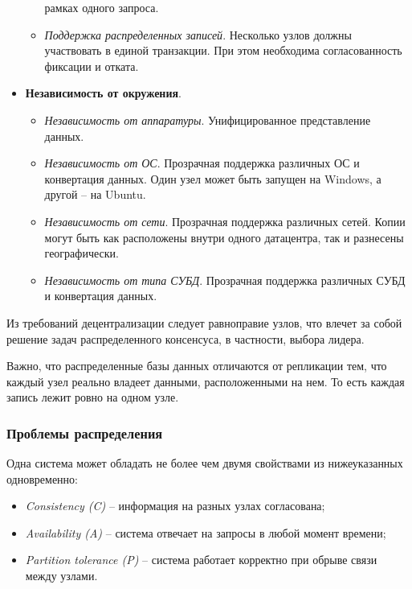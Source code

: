 \begin{itemize}
\begin{itemize}
		            рамках одного запроса.
		      \item \textit{Поддержка распределенных записей}. Несколько узлов должны участвовать в
		            единой транзакции. При этом необходима согласованность фиксации и отката.
	      \end{itemize}
	\item \textbf{Независимость от окружения}.
	      \begin{itemize}
		      \item \textit{Независимость от аппаратуры}. Унифицированное представление данных.
		      \item \textit{Независимость от ОС}. Прозрачная поддержка различных ОС и конвертация
		            данных. Один узел может быть запущен на Windows, а другой -- на Ubuntu.
		      \item \textit{Независимость от сети}. Прозрачная поддержка различных сетей. Копии могут
		            быть как расположены внутри одного датацентра, так и разнесены географически.
		      \item \textit{Независимость от типа СУБД}. Прозрачная поддержка различных СУБД и
		            конвертация данных.
	      \end{itemize}
\end{itemize}

Из требований децентрализации следует равноправие узлов, что влечет за собой решение задач
распределенного консенсуса, в частности, выбора лидера.

\begin{remark}
	Важно, что распределенные базы данных отличаются от репликации тем, что каждый узел реально владеет
	данными, расположенными на нем. То есть каждая запись лежит ровно на одном узле.
\end{remark}

\subsubsection{Проблемы распределения}

\begin{theorem}
	Одна система может обладать не более чем двумя свойствами из нижеуказанных
	одновременно:
	\begin{itemize}
		\item \textit{Consistency (C)} -- информация на разных узлах согласована;
		\item \textit{Availability (A)} -- система отвечает на запросы в любой момент времени;
		\item \textit{Partition tolerance (P)} -- система работает корректно при обрыве связи между узлами.
	\end{itemize}
\end{theorem}


